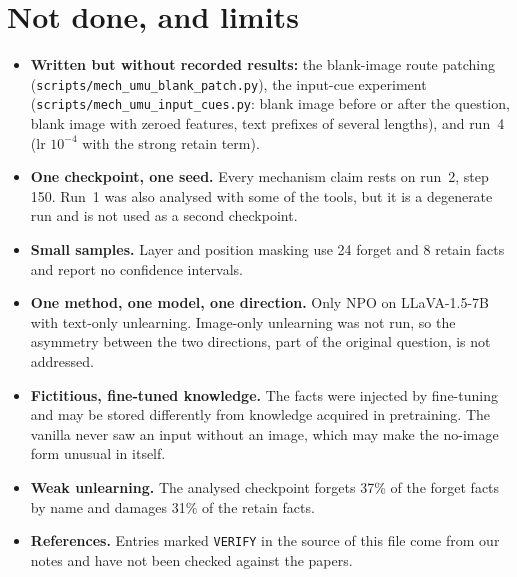 \documentclass[11pt]{article}
\begin{document}
\section{Not done, and limits}
\begin{itemize}
\item \textbf{Written but without recorded results:} the blank-image route patching
(\texttt{scripts/mech\_umu\_blank\_patch.py}), the input-cue experiment
(\texttt{scripts/mech\_umu\_input\_cues.py}: blank image before or after the question,
blank image with zeroed features, text prefixes of several lengths), and run~4 (lr
$10^{-4}$ with the strong retain term).
\item \textbf{One checkpoint, one seed.} Every mechanism claim rests on run~2, step 150.
Run~1 was also analysed with some of the tools, but it is a degenerate run and is not
used as a second checkpoint.
\item \textbf{Small samples.} Layer and position masking use 24 forget and 8 retain facts
and report no confidence intervals.
\item \textbf{One method, one model, one direction.} Only NPO on LLaVA-1.5-7B with
text-only unlearning. Image-only unlearning was not run, so the asymmetry between the two
directions, part of the original question, is not addressed.
\item \textbf{Fictitious, fine-tuned knowledge.} The facts were injected by fine-tuning and
may be stored differently from knowledge acquired in pretraining. The vanilla never saw an
input without an image, which may make the no-image form unusual in itself.
\item \textbf{Weak unlearning.} The analysed checkpoint forgets 37\% of the forget facts by
name and damages 31\% of the retain facts.
\item \textbf{References.} Entries marked \texttt{VERIFY} in the source of this file come
from our notes and have not been checked against the papers.
\end{itemize}
\end{document}
